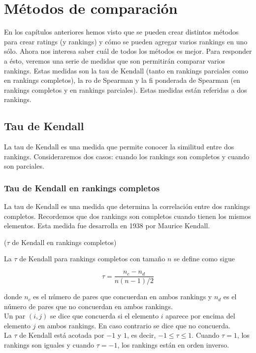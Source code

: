 \chapter{Métodos de comparación}

En los capítulos anteriores hemos visto que se pueden crear distintos métodos para crear ratings (y rankings) y cómo se pueden agregar varios rankings en uno sólo. Ahora nos interesa saber cuál de todos los métodos es mejor. Para responder a ésto, veremos una serie de medidas que son permitirán comparar varios rankings. Estas medidas son la tau de Kendall (tanto en rankings parciales como en rankings completos), la ro de Spearman y la fi ponderada de Spearman (en rankings completos y en rankings parciales). Estas medidas están referidas a dos rankings.

\section{Tau de Kendall}

La tau de Kendall es una medida que permite conocer la similitud entre dos rankings. Consideraremos dos casos: cuando los rankings son completos y cuando son parciales.

\subsection{Tau de Kendall en rankings completos}

La tau de Kendall es una medida que determina la correlación entre dos rankings completos. Recordemos que dos rankings son completos cuando tienen los mismos elementos. Esta medida fue desarrolla en 1938 por Maurice Kendall.\\

\begin{defi}($\tau$ de Kendall en rankings completos) 

La $\tau$ de Kendall para rankings completos con tamaño $n$ se define como sigue

\begin{equation} \label{def:tau_kendall}
\tau = \dfrac{n_c - n_d}{n(n-1)/2}
\end{equation}

donde $n_c$ es el número de pares que concuerdan en ambos rankings y $n_d$ es el número de pares que no concuerdan en ambos rankings.\\

Un par $(i,j)$ se dice que concuerda si el elemento $i$ aparece por encima del elemento $j$ en ambos rankings. En caso contrario se dice que no concuerda.\\


La $\tau$ de Kendall está acotada por $-1$ y $1$, es decir, $-1 \leq \tau \leq 1$. Cuando $\tau = 1$, los rankings son iguales y cuando $\tau = -1$, los rankings están en orden inverso.  
\end{defi}

